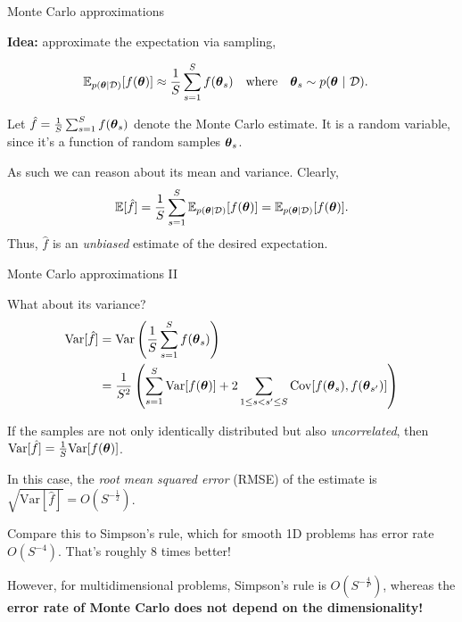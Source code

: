 \documentclass[aspectratio=169]{beamer}
\begin{document}
\begin{frame}{Monte Carlo approximations}

\textbf{Idea:} approximate the expectation via sampling,

\begin{align}
    \mathbb{E}_{p(\boldsymbol{\theta} | \mathcal{D})}[f(\boldsymbol{\theta})] &\approx \frac{1}{S} \sum_{s=1}^S f(\boldsymbol{\theta}_s) 
    \quad \text{where} \quad
    \boldsymbol{\theta}_s \sim p(\boldsymbol{\theta} ~\vert~ \mathcal{D}).
\end{align}

Let $\hat{f} = \frac{1}{S} \sum_{s=1}^S f(\boldsymbol{\theta}_s)$ denote the Monte Carlo estimate. It is a random variable, since it's a function of random samples $\boldsymbol{\theta}_s$. 

As such we can reason about its mean and variance. Clearly,
\begin{align}
    \mathbb{E}[\hat{f}] = \frac{1}{S} \sum_{s=1}^S \mathbb{E}_{p(\boldsymbol{\theta} | \mathcal{D})}[f(\boldsymbol{\theta})] = \mathbb{E}_{p(\boldsymbol{\theta} | \mathcal{D})}[f(\boldsymbol{\theta})].
\end{align}
Thus, $\hat{f}$ is an \emph{unbiased} estimate of the desired expectation.

\end{frame}

\begin{frame}{Monte Carlo approximations II}

What about its variance?
\begin{align}
    \mathrm{Var}[\hat{f}] 
    &= \mathrm{Var} \left(\frac{1}{S} \sum_{s=1}^S f(\boldsymbol{\theta}_s) \right) \\
    &= \frac{1}{S^2} \left( \sum_{s=1}^S \mathrm{Var}[f(\boldsymbol{\theta})] + 2 \sum_{1 \leq s < s' \leq S} \mathrm{Cov} [f(\boldsymbol{\theta}_s),  f(\boldsymbol{\theta}_{s'})] \right)
\end{align}

If the samples are not only identically distributed but also \emph{uncorrelated}, then~$\mathrm{Var}[\hat{f}] = \frac{1}{S} \mathrm{Var}[f(\boldsymbol{\theta})]$.

In this case, the \emph{root mean squared error} (RMSE) of the estimate is $\sqrt{\mathrm{Var}[\hat{f}]} = O(S^{-\frac{1}{2}})$.

Compare this to Simpson's rule, which for smooth 1D problems has error rate~$O(S^{-4})$. That's roughly 8 times better!

However, for multidimensional problems, Simpson's rule is $O(S^{-\frac{4}{P}})$, whereas the \textbf{error rate of Monte Carlo does not depend on the dimensionality!}

\end{frame}
\end{document}
